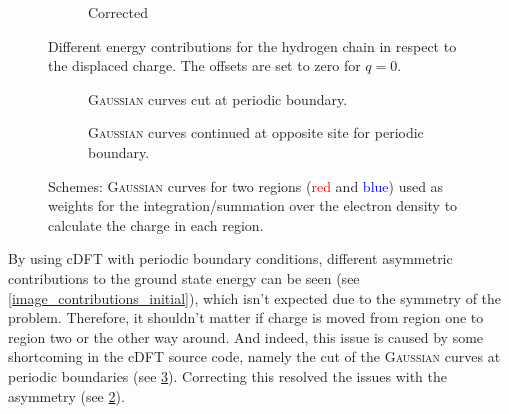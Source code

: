 \begin{figure}
\begin{subfigure}{0.45\textwidth}
		\caption{Corrected}
		\label{image_contributions_corrected}
	\end{subfigure}
	\caption{Different energy contributions for the hydrogen chain in respect to the displaced charge. The offsets are set to zero for $q=0$.}
\end{figure}
\begin{figure}
	\centering
	\begin{subfigure}{0.45\textwidth}
		\centering
		\caption{\textsc{Gaussian} curves cut at periodic boundary.\\}
	\end{subfigure}\hspace*{1cm}
	\begin{subfigure}{0.45\textwidth}
		\centering
		\caption{\textsc{Gaussian} curves continued at opposite site for periodic boundary.}
	\end{subfigure}
	\caption[Schemes: \textsc{Gaussian} curves from cDFT with periodic boundary conditions.]{Schemes: \textsc{Gaussian} curves for two regions (\textcolor{red}{red} and \textcolor{blue}{blue}) used as weights for the integration/summation over the electron density to calculate the charge in each region.}
	\label{image_periodicity_gaussians}
\end{figure} 
By using cDFT with periodic boundary conditions, different asymmetric contributions to the ground state energy can be seen (see \cref{image_contributions_initial}), which isn't expected due to the symmetry of the problem. Therefore, it shouldn't matter if charge is moved from region one to region two or the other way around. And indeed, this issue is caused by some shortcoming in the cDFT source code, namely the cut of the \textsc{Gaussian} curves at periodic boundaries (see \cref{image_periodicity_gaussians}). Correcting this resolved the issues with the asymmetry (see \cref{image_contributions_corrected}).\\
